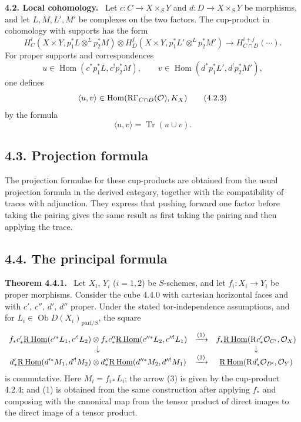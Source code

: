 \documentclass[11pt]{article}
\theoremstyle{plain}
\theoremstyle{definition}
\theoremstyle{remark}
\newenvironment{statement}[1]{\par\medskip\noindent\textbf{#1.}\ }{\par\medskip}
\DeclareMathOperator{\Hom}{Hom}
\DeclareMathOperator{\ob}{Ob}
\DeclareMathOperator{\Tr}{Tr}
\newcommand{\R}{\mathrm R}
\begin{document}
\begin{statement}{4.2. Local cohomology}
Let $c:C\to X\times_S Y$ and $d:D\to X\times_S Y$ be morphisms, and let $L,M,L',M'$ be complexes on the two factors. The cup-product in cohomology with supports has the form
\begin{equation}
H^i_C(X\times Y,p_1^*L\otimes^L p_2^*M)\otimes
H^j_D(X\times Y,p_1^*L'\otimes^L p_2^*M')
\longrightarrow
H^{i+j}_{C\cap D}(\cdots).
\tag{4.2.1}
\end{equation}
For proper supports and correspondences
\[
   u\in\Hom(c^*p_1^*L,c^!p_2^*M),
   \qquad
   v\in\Hom(d^*p_1^*L',d^!p_2^*M'),
\]
one defines
\begin{equation}
   \langle u,v\rangle\in \Hom(\R\Gamma_{C\cap D}(\cO),K_X)
   \tag{4.2.3}
\end{equation}
by the formula
\begin{equation}
   \langle u,v\rangle=\Tr(u\cup v).
   \tag{4.2.4}
\end{equation}
\end{statement}

\subsection*{4.3. Projection formula}
The projection formulae for these cup-products are obtained from the usual projection formula in the derived category, together with the compatibility of traces with adjunction. They express that pushing forward one factor before taking the pairing gives the same result as first taking the pairing and then applying the trace.

\subsection*{4.4. The principal formula}
\begin{statement}{Theorem 4.4.1}
Let $X_i$, $Y_i$ ($i=1,2$) be $S$-schemes, and let $f_i:X_i\to Y_i$ be proper morphisms. Consider the cube 4.4.0 with cartesian horizontal faces and with $c'$, $c''$, $d'$, $d''$ proper. Under the stated tor-independence assumptions, and for $L_i\in\ob D(X_i)_{\mathrm{parf}/S}$, the square
\[
\begin{array}{ccc}
 f_*c'_*\underline{\R\Hom}(c'^*L_1,c'^!L_2)\otimes
 f_*c''_*\underline{\R\Hom}(c''^*L_2,c''^!L_1)
 & \xrightarrow{(1)} &
 f_*\underline{\R\Hom}(\R c'_*\cO_{C'},\cO_X) \\
 \downarrow & & \downarrow \\
 d'_*\underline{\R\Hom}(d'^*M_1,d'^!M_2)\otimes
 d''_*\underline{\R\Hom}(d''^*M_2,d''^!M_1)
 & \xrightarrow{(3)} &
 \underline{\R\Hom}(\R d'_*\cO_{D'},\cO_Y)
\end{array}
\]
is commutative. Here $M_i=f_{i*}L_i$; the arrow (3) is given by the cup-product 4.2.4; and (1) is obtained from the same construction after applying $f_*$ and composing with the canonical map from the tensor product of direct images to the direct image of a tensor product.
\end{statement}
\end{document}

